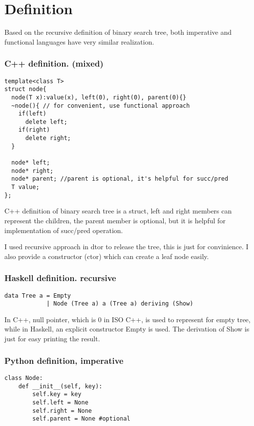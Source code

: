 \documentclass{article}
\begin{document}
\section{Definition}
\label{definition}

Based on the recursive definition of binary search tree, both imperative and functional 
languages have very similar realization.

\subsubsection*{C++ definition. (mixed)}
\lstset{language=C++}
\begin{lstlisting}
template<class T>
struct node{
  node(T x):value(x), left(0), right(0), parent(0){}
  ~node(){ // for convenient, use functional approach
    if(left)
      delete left;
    if(right)
      delete right;
  }

  node* left; 
  node* right;
  node* parent; //parent is optional, it's helpful for succ/pred
  T value;
};
\end{lstlisting}

C++ definition of binary search tree is a struct, left
and right members can represent the children, the parent member is optional, but
it is helpful for implementation of succ/pred operation.

I used recursive approach in dtor to release the tree, this is just for 
convinience. I also provide a constructor (ctor) which can create a leaf
node easily.

\subsubsection*{Haskell definition. recursive}
\lstset{language=Haskell}
\begin{lstlisting}
data Tree a = Empty 
            | Node (Tree a) a (Tree a) deriving (Show)
\end{lstlisting}

In C++, null pointer, which is 0 in ISO C++, is used to represent for empty
tree, while in Haskell, an explicit constructor Empty is used. The derivation
of Show is just for easy printing the result.

\subsubsection*{Python definition, imperative}
\lstset{language=Python}
\begin{lstlisting}
class Node:
    def __init__(self, key):
        self.key = key
        self.left = None
        self.right = None
        self.parent = None #optional
\end{lstlisting}
\end{document}
